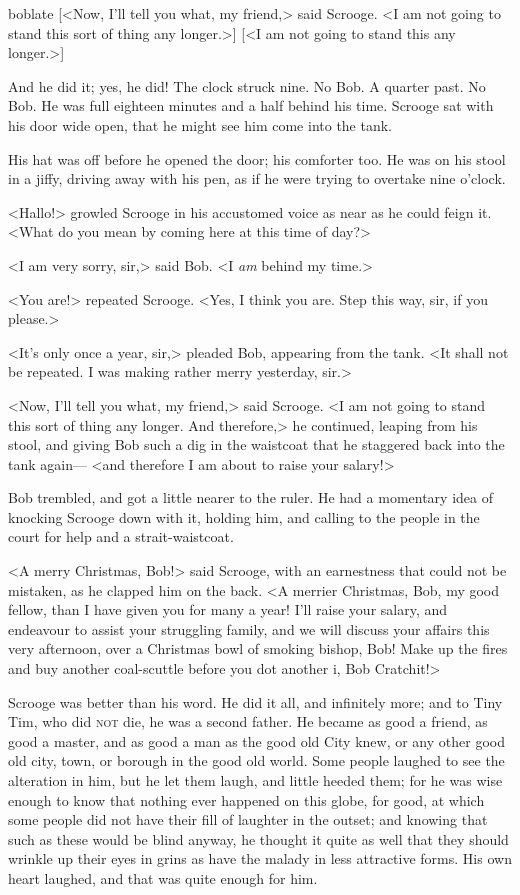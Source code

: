 \begin{colorbigpic}
	[\basicscale]
	{boblate}
	[<Now, I'll tell you what, my friend,> said Scrooge. <I am not going to stand this sort of thing any longer.>]
	[<I am not going to stand this any longer.>]
\end{colorbigpic}


And he did it; yes, he did! The clock struck nine. No Bob. A quarter past. No Bob. He was full eighteen minutes and a half behind his time. Scrooge sat with his door wide open, that he might see him come into the tank.

His hat was off before he opened the door; his comforter too. He was on his stool in a jiffy, driving away with his pen, as if he were trying to overtake nine o'clock.

<Hallo!> growled Scrooge in his accustomed voice as near as he could feign it. <What do you mean by coming here at this time of day?>

<I am very sorry, sir,> said Bob. <I \textit{am} behind my time.>

<You are!> repeated Scrooge. <Yes, I think you are. Step this way, sir, if you please.>

<It's only once a year, sir,> pleaded Bob, appearing from the tank. <It shall not be repeated. I was making rather merry yesterday, sir.>

<Now, I'll tell you what, my friend,> said Scrooge. <I am not going to stand this sort of thing any longer. And therefore,> he continued, leaping from his stool, and giving Bob such a dig in the waistcoat that he staggered back into the tank again— <and therefore I am about to raise your salary!>

Bob trembled, and got a little nearer to the ruler. He had a momentary idea of knocking Scrooge down with it, holding him, and calling to the people in the court for help and a strait-waistcoat.

<A merry Christmas, Bob!> said Scrooge, with an earnestness that could not be mistaken, as he clapped him on the back. <A merrier Christmas, Bob, my good fellow, than I have given you for many a year! I'll raise your salary, and endeavour to assist your struggling family, and we will discuss your affairs this very afternoon, over a Christmas bowl of smoking bishop, Bob! Make up the fires and buy another coal-scuttle before you dot another i, Bob Cratchit!>

Scrooge was better than his word. He did it all, and infinitely more; and to Tiny Tim, who did \textsc{not} die, he was a second father. He became as good a friend, as good a master, and as good a man as the good old City knew, or any other good old city, town, or borough in the good old world. Some people laughed to see the alteration in him, but he let them laugh, and little heeded them; for he was wise enough to know that nothing ever happened on this globe, for good, at which some people did not have their fill of laughter in the outset; and knowing that such as these would be blind anyway, he thought it quite as well that they should wrinkle up their eyes in grins as have the malady in less attractive forms. His own heart laughed, and that was quite enough for him.

